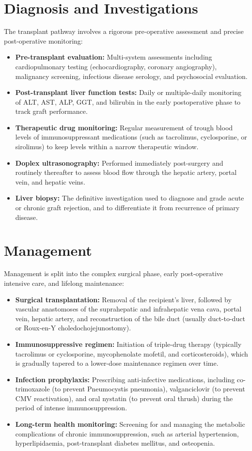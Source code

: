 \section*{Diagnosis and Investigations}
The transplant pathway involves a rigorous pre-operative assessment and precise post-operative monitoring:

\begin{itemize}
    \item \textbf{Pre-transplant evaluation:} Multi-system assessments including cardiopulmonary testing (echocardiography, coronary angiography), malignancy screening, infectious disease serology, and psychosocial evaluation.
    \item \textbf{Post-transplant liver function tests:} Daily or multiple-daily monitoring of ALT, AST, ALP, GGT, and bilirubin in the early postoperative phase to track graft performance.
    \item \textbf{Therapeutic drug monitoring:} Regular measurement of trough blood levels of immunosuppressant medications (such as tacrolimus, cyclosporine, or sirolimus) to keep levels within a narrow therapeutic window.
    \item \textbf{Doplex ultrasonography:} Performed immediately post-surgery and routinely thereafter to assess blood flow through the hepatic artery, portal vein, and hepatic veins.
    \item \textbf{Liver biopsy:} The definitive investigation used to diagnose and grade acute or chronic graft rejection, and to differentiate it from recurrence of primary disease.
\end{itemize}

\section*{Management}
Management is split into the complex surgical phase, early post-operative intensive care, and lifelong maintenance:

\begin{itemize}
    \item \textbf{Surgical transplantation:} Removal of the recipient's liver, followed by vascular anastomoses of the suprahepatic and infrahepatic vena cava, portal vein, hepatic artery, and reconstruction of the bile duct (usually duct-to-duct or Roux-en-Y choledochojejunostomy).
    \item \textbf{Immunosuppressive regimen:} Initiation of triple-drug therapy (typically tacrolimus or cyclosporine, mycophenolate mofetil, and corticosteroids), which is gradually tapered to a lower-dose maintenance regimen over time.
    \item \textbf{Infection prophylaxis:} Prescribing anti-infective medications, including co-trimoxazole (to prevent Pneumocystis pneumonia), valganciclovir (to prevent CMV reactivation), and oral nystatin (to prevent oral thrush) during the period of intense immunosuppression.
    \item \textbf{Long-term health monitoring:} Screening for and managing the metabolic complications of chronic immunosuppression, such as arterial hypertension, hyperlipidaemia, post-transplant diabetes mellitus, and osteopenia.
\end{itemize}

